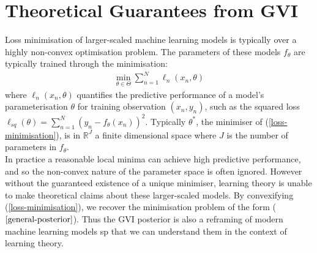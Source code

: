 \documentclass[twoside,11pt]{article}
\newcommand{\jw}[1]{{\color{gray} [JW: #1]}}
\begin{document}
\section{Theoretical Guarantees from GVI \cite{wild2023rigorous}}
Loss minimisation of larger-scaled machine learning models is typically over a highly non-convex optimisation problem. The parameters of these models $f_{\theta}$ are typically trained through the minimisation:
\begin{align}
\min_{\theta \in \Theta} \sum_{n=1}^N\ell_n(x_n, \theta)
\label{loss-minimisation}
\end{align}
where $\ell_n(x_n, \theta)$ quantifies the predictive performance of a model's parameterisation $\theta$ for training observation $(x_n, y_n)$, such as the squared loss $\ell_{sq}(\theta) = \sum_{n=1}^N \left(y_n - f_{\theta}(x_n)\right)^2$. Typically $\theta^*$, the minimiser of (\ref{loss-minimisation}), is in $ \mathbb{R}^J$ a finite dimensional space where $J$ is the number of parameters in $f_{\theta}$.\\
\newline
In practice a reasonable local minima can achieve high predictive performance, and so the non-convex nature of the parameter space is often ignored. However without the guaranteed existence of a unique minimiser, learning theory is unable to make theoretical claims about these larger-scaled models. By convexifying (\ref{loss-minimisation}), we recover the minimisation problem of the form ($\ref{general-posterior}$). Thus the GVI posterior is also a reframing of modern machine learning models sp that we can understand them in the context of learning theory.
\end{document}
